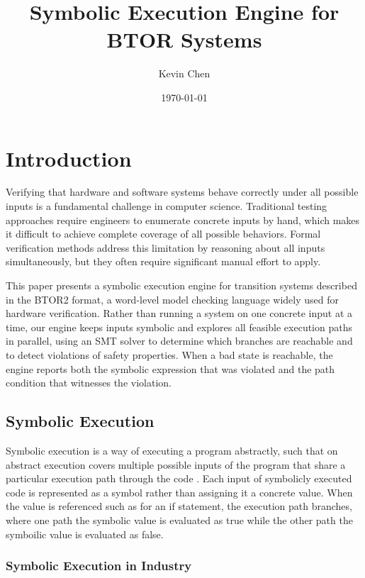 \documentclass[11pt]{article}
\title{Symbolic Execution Engine for BTOR Systems}
\author{Kevin Chen}
\date{\today}
\begin{document}
\maketitle

\section{Introduction}

Verifying that hardware and software systems behave correctly under all possible inputs is a fundamental challenge in computer science. Traditional testing approaches require engineers to enumerate concrete inputs by hand, which makes it difficult to achieve complete coverage of all possible behaviors. Formal verification methods address this limitation by reasoning about all inputs simultaneously, but they often require significant manual effort to apply.

This paper presents a symbolic execution engine for transition systems described in the BTOR2 format, a word-level model checking language widely used for hardware verification. Rather than running a system on one concrete input at a time, our engine keeps inputs symbolic and explores all feasible execution paths in parallel, using an SMT solver to determine which branches are reachable and to detect violations of safety properties. When a bad state is reachable, the engine reports both the symbolic expression that was violated and the path condition that witnesses the violation.

\subsection{Symbolic Execution}

Symbolic execution is a way of executing a program abstractly, such that on abstract execution covers multiple possible inputs of the program that share a particular execution path through the code \cite{aldrich2018symbolic}. Each input of symbolicly executed code is represented as a symbol rather than assigning it a concrete value. When the value is referenced such as for an if statement, the execution path branches, where one path the symbolic value is evaluated as true while the other path the symboilic value is evaluated as false.

\subsubsection{Symbolic Execution in Industry}
\end{document}
